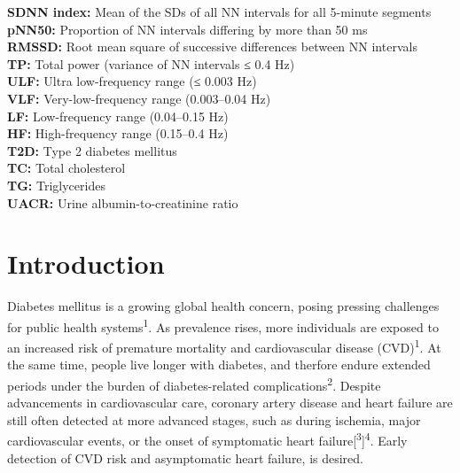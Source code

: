 \documentclass[
  a4paper,
  headsepline=true,
  open=any]{scrbook}
\begin{document}
\textbf{SDNN index:} Mean of the SDs of all NN intervals for all
5-minute segments\\
\textbf{pNN50:} Proportion of NN intervals differing by more than 50
ms\\
\textbf{RMSSD:} Root mean square of successive differences between NN
intervals\\
\textbf{TP:} Total power (variance of NN intervals ≤ 0.4 Hz)\\
\textbf{ULF:} Ultra low-frequency range (≤ 0.003 Hz)\\
\textbf{VLF:} Very-low-frequency range (0.003--0.04 Hz)\\
\textbf{LF:} Low-frequency range (0.04--0.15 Hz)\\
\textbf{HF:} High-frequency range (0.15--0.4 Hz)\\
\textbf{T2D:} Type 2 diabetes mellitus\\
\textbf{TC:} Total cholesterol\\
\textbf{TG:} Triglycerides\\
\textbf{UACR:} Urine albumin-to-creatinine ratio


\hypertarget{introduction}{%
\chapter{Introduction}\label{introduction}}

Diabetes mellitus is a growing global health concern, posing pressing
challenges for public health systems\textsuperscript{1}. As prevalence
rises, more individuals are exposed to an increased risk of premature
mortality and cardiovascular disease (CVD)\textsuperscript{1}. At the
same time, people live longer with diabetes, and therfore endure
extended periods under the burden of diabetes-related
complications\textsuperscript{2}. Despite advancements in cardiovascular
care, coronary artery disease and heart failure are still often detected
at more advanced stages, such as during ischemia, major cardiovascular
events, or the onset of symptomatic heart
failure{[}\textsuperscript{3}{]}\textsuperscript{4}. Early detection of
CVD risk and asymptomatic heart failure, is desired.
\end{document}
